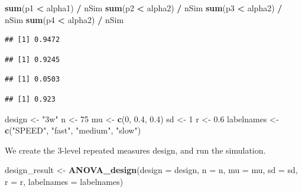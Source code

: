 \documentclass[]{book}
\newenvironment{Shaded}{\begin{snugshade}}{\end{snugshade}}
\newcommand{\DataTypeTok}[1]{\textcolor[rgb]{0.13,0.29,0.53}{#1}}
\newcommand{\DecValTok}[1]{\textcolor[rgb]{0.00,0.00,0.81}{#1}}
\newcommand{\FloatTok}[1]{\textcolor[rgb]{0.00,0.00,0.81}{#1}}
\newcommand{\KeywordTok}[1]{\textcolor[rgb]{0.13,0.29,0.53}{\textbf{#1}}}
\newcommand{\NormalTok}[1]{#1}
\newcommand{\OperatorTok}[1]{\textcolor[rgb]{0.81,0.36,0.00}{\textbf{#1}}}
\newcommand{\StringTok}[1]{\textcolor[rgb]{0.31,0.60,0.02}{#1}}
\begin{document}
\begin{Shaded}
\begin{Highlighting}[]
\KeywordTok{sum}\NormalTok{(p1 }\OperatorTok{<}\StringTok{ }\NormalTok{alpha1) }\OperatorTok{/}\StringTok{ }\NormalTok{nSim}
\KeywordTok{sum}\NormalTok{(p2 }\OperatorTok{<}\StringTok{ }\NormalTok{alpha2) }\OperatorTok{/}\StringTok{ }\NormalTok{nSim}
\KeywordTok{sum}\NormalTok{(p3 }\OperatorTok{<}\StringTok{ }\NormalTok{alpha2) }\OperatorTok{/}\StringTok{ }\NormalTok{nSim}
\KeywordTok{sum}\NormalTok{(p4 }\OperatorTok{<}\StringTok{ }\NormalTok{alpha2) }\OperatorTok{/}\StringTok{ }\NormalTok{nSim}
\end{Highlighting}
\end{Shaded}

\begin{verbatim}
## [1] 0.9472
\end{verbatim}

\begin{verbatim}
## [1] 0.9245
\end{verbatim}

\begin{verbatim}
## [1] 0.0503
\end{verbatim}

\begin{verbatim}
## [1] 0.923
\end{verbatim}

\begin{Shaded}
\begin{Highlighting}[]
\NormalTok{design <-}\StringTok{ "3w"}
\NormalTok{n <-}\StringTok{ }\DecValTok{75}
\NormalTok{mu <-}\StringTok{ }\KeywordTok{c}\NormalTok{(}\DecValTok{0}\NormalTok{, }\FloatTok{0.4}\NormalTok{, }\FloatTok{0.4}\NormalTok{)}
\NormalTok{sd <-}\StringTok{ }\DecValTok{1}
\NormalTok{r <-}\StringTok{ }\FloatTok{0.6}
\NormalTok{labelnames <-}\StringTok{ }\KeywordTok{c}\NormalTok{(}\StringTok{"SPEED"}\NormalTok{, }
                \StringTok{"fast"}\NormalTok{, }\StringTok{"medium"}\NormalTok{, }\StringTok{"slow"}\NormalTok{)}
\end{Highlighting}
\end{Shaded}

We create the 3-level repeated measures design, and run the simulation.

\begin{Shaded}
\begin{Highlighting}[]
\NormalTok{design_result <-}\StringTok{ }\KeywordTok{ANOVA_design}\NormalTok{(}\DataTypeTok{design =}\NormalTok{ design,}
                   \DataTypeTok{n =}\NormalTok{ n, }
                   \DataTypeTok{mu =}\NormalTok{ mu, }
                   \DataTypeTok{sd =}\NormalTok{ sd, }
                   \DataTypeTok{r =}\NormalTok{ r, }
                   \DataTypeTok{labelnames =}\NormalTok{ labelnames)}
\end{Highlighting}
\end{Shaded}
\end{document}
